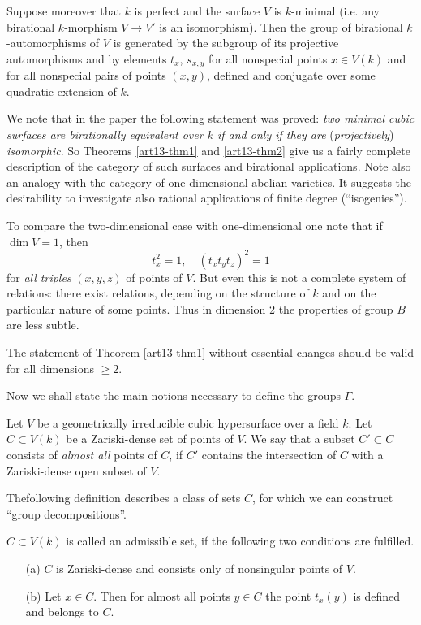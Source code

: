 \begin{theorem}\label{art13-thm2}
Suppose moreover that $k$ is perfect and the surface $V$ is $k$-minimal (i.e. any birational $k$-morphism $V\to V'$ is an isomorphism). Then the group of birational $k$-automorphisms of $V$ is generated by the subgroup of its projective automorphisms and by elements $t_{x}$, $s_{x,y}$ for all nonspecial points $x\in V(k)$ and for all nonspecial pairs of points $(x,y)$, defined and conjugate over some quadratic extension of $k$.
\end{theorem}

We note that in the paper \cite{art13-key2} the following statement was proved: {\em two minimal cubic surfaces are birationally equivalent over $k$ if and only if they are} ({\em projectively}) {\em isomorphic}. So Theorems \ref{art13-thm1} and \ref{art13-thm2} give us a fairly complete description of the category of such surfaces and birational applications. Note also an analogy with the category of one-dimensional abelian varieties. It suggests the desirability to investigate also rational applications of finite degree (``isogenies'').

To compare the two-dimensional case with one-dimensional one note that if $\dim V=1$, then
\begin{equation}
t^{2}_{x}=1,\quad (t_{x}t_{y}t_{z})^{2}=1\label{art13-eq2}
\end{equation}
for {\em all triples} $(x,y,z)$ of points of $V$. But even this is not a complete system of relations: there exist relations, depending on the structure of $k$ and on the particular nature of some points. Thus in dimension 2 the properties of group $B$ are less subtle.

The statement of Theorem \ref{art13-thm1} without essential changes should be valid for all dimensions $\geq 2$.

Now we shall state the main notions necessary to define the groups $\Gamma$.

Let $V$ be a geometrically irreducible cubic hypersurface over a field $k$. Let $C\subset V(k)$ be a Zariski-dense set of points of $V$. We say that a subset $C'\subset C$ consists of {\em almost all} points of $C$, if $C'$ contains the intersection of $C$ with a Zariski-dense open subset of $V$.

The\pageoriginale following definition describes a class of sets $C$, for which we can construct ``group decompositions''.

\begin{defi*}
$C\subset V(k)$ is called an admissible set, if the following two conditions are fulfilled.
\begin{itemize}
\item[\rm(a)] $C$ is Zariski-dense and consists only of nonsingular points of $V$.

\item[\rm(b)] Let $x\in C$. Then for almost all points $y\in C$ the point $t_{x}(y)$ is defined and belongs to $C$.
\end{itemize}
\end{defi*}

